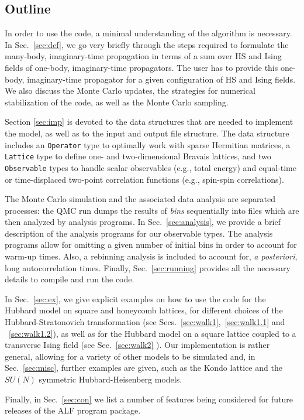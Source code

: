 \subsection{Outline}

In order to use the code, a minimal understanding of the algorithm is necessary. 
In Sec.~\ref{sec:def}, we go very briefly through  the steps required  to formulate the many-body, imaginary-time propagation in terms of a sum  over HS and Ising fields  of one-body,  imaginary-time propagators.   
The user has to provide this one-body, imaginary-time propagator for a given configuration of   HS and  Ising fields. 
We also discuss the Monte Carlo updates, the strategies for numerical stabilization of the code, as well as the Monte Carlo sampling.

Section \ref{sec:imp} is devoted to the data structures that are needed to implement the model, as well as to the input and output file structure.   
The data structure includes  an \texttt{Operator} type to  optimally work with sparse Hermitian matrices, a \texttt{Lattice} type  to define one- and two-dimensional Bravais lattices, and   two   \texttt{Observable} types to handle  scalar observables  (e.g., total energy)   and   equal-time or time-displaced two-point correlation functions (e.g., spin-spin correlations).

The Monte Carlo simulation and the associated data analysis are separated processes: the QMC run  dumps the results of \emph{bins}  sequentially into files  which are then analyzed by  analysis programs. In Sec.~\ref{sec:analysis}, we provide a brief description of the analysis programs  for our  observable types.  The analysis programs allow for omitting a given number of initial bins in order to account for warm-up times. Also, a rebinning analysis is included  to account for, \emph{a posteriori}, long autocorrelation times.  Finally, Sec.~\ref{sec:running} provides all the necessary details  to compile and run the code. 


In Sec.~\ref{sec:ex}, we  give explicit examples on how to use the code for  the  Hubbard model on square and honeycomb lattices,  for different choices of the Hubbard-Stratonovich transformation  (see Secs.~\ref{sec:walk1},~\ref{sec:walk1.1} and ~\ref{sec:walk1.2}), as well as for the Hubbard model on a square lattice coupled to a transverse Ising field (see Sec.~\ref{sec:walk2} ).   Our implementation is rather general, allowing for a variety of other models to be simulated and, in Sec.~\ref{sec:misc}, further examples are given, such as the Kondo lattice and the $SU(N)$ symmetric Hubbard-Heisenberg models.

Finally, in Sec.~\ref{sec:con} we list a number of features being considered for  future releases of the ALF program package.
